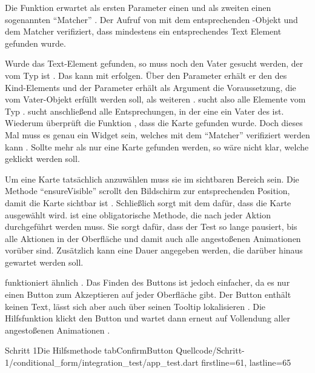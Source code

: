 Die Funktion  erwartet als ersten Parameter einen  und als zweiten einen sogenannten \enquote{Matcher} .
Der Aufruf von  mit dem entsprechenden -Objekt und dem Matcher  verifiziert, dass mindestens ein entsprechendes Text Element gefunden wurde.

Wurde das Text-Element gefunden, so muss noch den Vater gesucht werden, der vom Typ  ist . Das kann mit  erfolgen. Über den Parameter  erhält er den  des Kind-Elements und der Parameter  erhält als Argument die Voraussetzung, die vom Vater-Objekt erfüllt werden soll, als weiteren .  sucht also alle Elemente vom Typ .  sucht anschließend alle Entsprechungen, in der eine  ein Vater des  ist. Wiederum überprüft die Funktion , dass die Karte gefunden wurde. Doch dieses Mal muss es genau ein Widget sein, welches mit dem \enquote{Matcher}  verifiziert werden kann . Sollte mehr als nur eine Karte gefunden werden, so wäre nicht klar, welche geklickt werden soll.

Um eine Karte tatsächlich anzuwählen muss sie im sichtbaren Bereich sein. Die Methode \enquote{ensureVisible} scrollt den Bildschirm zur entsprechenden Position, damit die Karte sichtbar ist . Schließlich sorgt  mit dem   dafür, dass die Karte ausgewählt wird.   ist eine obligatorische Methode, die nach jeder Aktion durchgeführt werden muss. Sie sorgt dafür, dass der Test so lange pausiert, bis alle Aktionen in der Oberfläche und damit auch alle angestoßenen Animationen vorüber sind. Zusätzlich kann eine Dauer angegeben werden, die darüber hinaus gewartet werden soll. 

 funktioniert ähnlich \Lst{\ref{lst:Schritt1HilfsmethodeTabSelectionCard}}. Das Finden des Buttons ist jedoch einfacher, da es nur einen Button zum Akzeptieren auf jeder Oberfläche gibt. Der Button enthält keinen Text, lässt sich aber auch über seinen Tooltip lokalisieren . Die Hilfsfunktion klickt den Button  und wartet dann erneut auf Vollendung aller angestoßenen Animationen .

\begin{alexlisting}{Schritt 1}{Die Hilfsmethode tabConfirmButton}
  {Quellcode/Schritt-1/conditional_form/integration_test/app_test.dart}
  {firstline=61, lastline=65}
  \label{lst:Schritt1HilfsmethodeTabSelectionCard}
\end{alexlisting}

